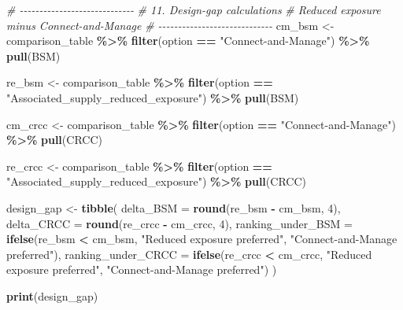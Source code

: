\documentclass[
]{article}
\newenvironment{Shaded}{\begin{snugshade}}{\end{snugshade}}
\newcommand{\AttributeTok}[1]{\textcolor[rgb]{0.13,0.29,0.53}{#1}}
\newcommand{\CommentTok}[1]{\textcolor[rgb]{0.56,0.35,0.01}{\textit{#1}}}
\newcommand{\DecValTok}[1]{\textcolor[rgb]{0.00,0.00,0.81}{#1}}
\newcommand{\FunctionTok}[1]{\textcolor[rgb]{0.13,0.29,0.53}{\textbf{#1}}}
\newcommand{\NormalTok}[1]{#1}
\newcommand{\OtherTok}[1]{\textcolor[rgb]{0.56,0.35,0.01}{#1}}
\newcommand{\SpecialCharTok}[1]{\textcolor[rgb]{0.81,0.36,0.00}{\textbf{#1}}}
\newcommand{\StringTok}[1]{\textcolor[rgb]{0.31,0.60,0.02}{#1}}
\begin{document}
\begin{Shaded}
\begin{Highlighting}[]
\CommentTok{\# {-}{-}{-}{-}{-}{-}{-}{-}{-}{-}{-}{-}{-}{-}{-}{-}{-}{-}{-}{-}{-}{-}{-}{-}{-}{-}{-}{-}{-}}
\CommentTok{\# 11. Design{-}gap calculations}
\CommentTok{\# Reduced exposure minus Connect{-}and{-}Manage}
\CommentTok{\# {-}{-}{-}{-}{-}{-}{-}{-}{-}{-}{-}{-}{-}{-}{-}{-}{-}{-}{-}{-}{-}{-}{-}{-}{-}{-}{-}{-}{-}}
\NormalTok{cm\_bsm }\OtherTok{\textless{}{-}}\NormalTok{ comparison\_table }\SpecialCharTok{\%\textgreater{}\%}
  \FunctionTok{filter}\NormalTok{(option }\SpecialCharTok{==} \StringTok{"Connect{-}and{-}Manage"}\NormalTok{) }\SpecialCharTok{\%\textgreater{}\%}
  \FunctionTok{pull}\NormalTok{(BSM)}

\NormalTok{re\_bsm }\OtherTok{\textless{}{-}}\NormalTok{ comparison\_table }\SpecialCharTok{\%\textgreater{}\%}
  \FunctionTok{filter}\NormalTok{(option }\SpecialCharTok{==} \StringTok{"Associated\_supply\_reduced\_exposure"}\NormalTok{) }\SpecialCharTok{\%\textgreater{}\%}
  \FunctionTok{pull}\NormalTok{(BSM)}

\NormalTok{cm\_crcc }\OtherTok{\textless{}{-}}\NormalTok{ comparison\_table }\SpecialCharTok{\%\textgreater{}\%}
  \FunctionTok{filter}\NormalTok{(option }\SpecialCharTok{==} \StringTok{"Connect{-}and{-}Manage"}\NormalTok{) }\SpecialCharTok{\%\textgreater{}\%}
  \FunctionTok{pull}\NormalTok{(CRCC)}

\NormalTok{re\_crcc }\OtherTok{\textless{}{-}}\NormalTok{ comparison\_table }\SpecialCharTok{\%\textgreater{}\%}
  \FunctionTok{filter}\NormalTok{(option }\SpecialCharTok{==} \StringTok{"Associated\_supply\_reduced\_exposure"}\NormalTok{) }\SpecialCharTok{\%\textgreater{}\%}
  \FunctionTok{pull}\NormalTok{(CRCC)}

\NormalTok{design\_gap }\OtherTok{\textless{}{-}} \FunctionTok{tibble}\NormalTok{(}
  \AttributeTok{delta\_BSM =} \FunctionTok{round}\NormalTok{(re\_bsm }\SpecialCharTok{{-}}\NormalTok{ cm\_bsm, }\DecValTok{4}\NormalTok{),}
  \AttributeTok{delta\_CRCC =} \FunctionTok{round}\NormalTok{(re\_crcc }\SpecialCharTok{{-}}\NormalTok{ cm\_crcc, }\DecValTok{4}\NormalTok{),}
  \AttributeTok{ranking\_under\_BSM =} \FunctionTok{ifelse}\NormalTok{(re\_bsm }\SpecialCharTok{\textless{}}\NormalTok{ cm\_bsm,}
                             \StringTok{"Reduced exposure preferred"}\NormalTok{,}
                             \StringTok{"Connect{-}and{-}Manage preferred"}\NormalTok{),}
  \AttributeTok{ranking\_under\_CRCC =} \FunctionTok{ifelse}\NormalTok{(re\_crcc }\SpecialCharTok{\textless{}}\NormalTok{ cm\_crcc,}
                              \StringTok{"Reduced exposure preferred"}\NormalTok{,}
                              \StringTok{"Connect{-}and{-}Manage preferred"}\NormalTok{)}
\NormalTok{)}

\FunctionTok{print}\NormalTok{(design\_gap)}
\end{Highlighting}
\end{Shaded}
\end{document}
